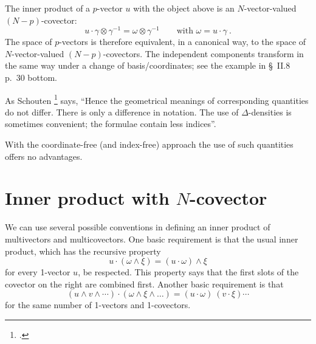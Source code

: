 \documentclass[\ifafour a4paper,12pt,\else a5paper,10pt,\fi%
onecolumn,oneside,article,%
british%
]{memoir}
\theoremstyle{remark}
\theoremstyle{innote}
\newcommand*{\citey}{\footcites}%
\renewcommand*{\|}[1][]{\nonscript\,#1\vert\nonscript\;\mathopen{}}
\newcommand*{\sect}{\S}%
\begin{document}
The inner product of a $p$-vector $u$ with the object above is an
$N$-vector-valued $(N-p)$-covector:
\begin{equation}
  \label{eq:hypervolume-valued-covector}
  u \cdot \gamma \otimes \gamma^{-1} = \omega \otimes \gamma^{-1}
  \qquad \text{with } \omega = u \cdot \gamma \ .
\end{equation}
The space of $p$-vectors is therefore equivalent, in a canonical way, to
the space of $N$-vector-valued $(N-p)$-covectors. The independent
components transform in the same way under a change of basis/coordinates;
see the example in \textcite{schouten1951_r1989} \sect~II.8 p.~30 bottom.

As Schouten \citey[\sect~II.8 p.~30]{schouten1951_r1989} says,
\enquote{Hence the geometrical meanings of corresponding quantities do not
  differ. There is only a difference in notation. \textelp{} The use of
  $\Delta$-densities is sometimes convenient; \textelp{} the formulae
  contain less indices}.

With the coordinate-free (and index-free) approach the use of such
quantities offers no advantages.


\section{Inner product with $N$-covector}
\label{sec:inner_volume}

We can use several possible conventions in defining an inner product of
multivectors and multicovectors. One basic requirement is that the usual
inner product, which has the recursive property
\begin{equation}
  \label{eq:basic_inner_prod}
  u \cdot (\omega\land \xi) = (u \cdot \omega)\land \xi 
\end{equation}
for every 1-vector $u$, be respected. This property says that the first
slots of the covector on the right are combined first. Another basic
requirement is that
\begin{equation}
  \label{eq:basic_inner_prod_volumes}
  (u \land v \land \dotsb) \cdot (\omega\land \xi \land \dots) = (u \cdot
  \omega)\ (v \cdot \xi) \dotsm
\end{equation}
for the same number of 1-vectors and 1-covectors.
\end{document}
